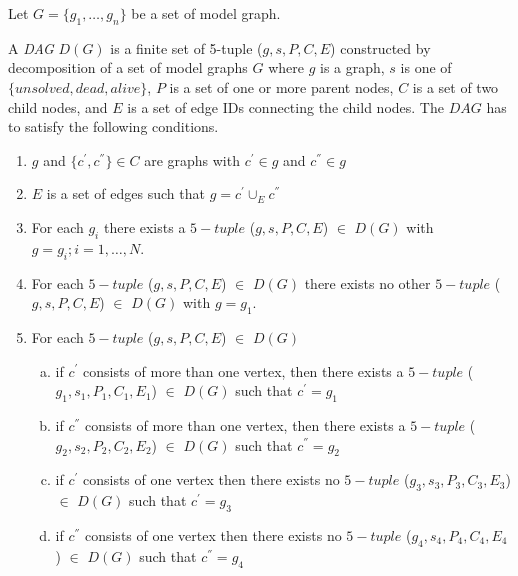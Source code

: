 Let $G=\{g_1 ,\ldots, g_n \}$ be a set of model graph. 
\begin{definition}
A \emph{DAG}  $D(G)$  is a finite set of 5-tuple ($g,s,P,C,E$) constructed by decomposition of a set of model graphs $G$
where $g$ is a graph, $s$ is one of $\{unsolved, dead, alive\}$,  $P$ is a set of one or more parent nodes, $C$ is a set of two child nodes, and $E$ 
is a set of edge IDs connecting the child nodes. The $DAG$ has to satisfy the following conditions.


\begin{enumerate}[(1)]
\item $g$ and $\{c^{'} ,c^{''} \}\in C$ are graphs with $c^{'}\in g$ and $c^{''} \in g$
\item $E$ is a set of edges such that $g=c^{'}\cup_{E} c^{''}$
\item For each $g_{i}$ there exists a $5-tuple$ ($g,s,P,C,E$) $\in$ $D(G)$ with $g=g_i;i=1,\ldots,N$.
\item For each  $5-tuple$ ($g,s,P,C,E$) $\in$ $D(G)$ there exists no other  $5-tuple$ ($g,s,P,C,E$) $\in$ $D(G)$ with $g=g_1$.
\item For each  $5-tuple$ ($g,s,P,C,E$) $\in$ $D(G)$

\begin{enumerate}[a.]
\item if $c^{'}$ consists of more than one vertex, then there exists a  $5-tuple$ ($g_1,s_1,P_1,C_1,E_1$) $\in$ $D(G)$ such that $c^{'}=g_1$ 
\item if $c^{''}$ consists of more than one vertex, then there exists a  $5-tuple$ ($g_2,s_2,P_2,C_2,E_2$) $\in$ $D(G)$ such that $c^{''}=g_2$ 
\item if $c^{'}$ consists of one vertex then there exists no  $5-tuple$ ($g_3,s_3,P_3,C_3,E_3$) $\in$ $D(G)$ such that $c^{'}=g_3$ 
\item if $c^{''}$ consists of one vertex then there exists no  $5-tuple$ ($g_4,s_4,P_4,C_4,E_4$) $\in$ $D(G)$ such that $c^{''}=g_4$ 
\end{enumerate}

\end{enumerate}
\end{definition}

